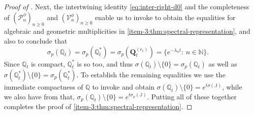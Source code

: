 \documentclass[10pt]{amsart}
\theoremstyle{plain}
\theoremstyle{definition}
\newcommand{\N}{\mathbb{N}}
\renewcommand{\P}{\mathcal{P}}
\newcommand{\V}{\mathcal{V}}
\newcommand{\J}{\mathds{Q}}
\newcommand{\calJ}{\mathds{J}}
\newcommand{\vat}{{\mathsf{r}_1}}
\newcommand{\Q}[1][\mo]{\mathbf{Q}^{({#1})}}
\let\mo\mu
\begin{document}
\begin{proof}[Proof of ]
Next, the intertwining identity \eqref{eq:inter-right-d0} and the completeness of $(\P_n^\phi)_{n \geq 0}$ and $(\V_n^\phi)_{n \geq 0}$ enable us to invoke \cite[Prop.\,11.4]{Patie-Savov-GeL} to obtain the equalities for algebraic and geometric multiplicities in \eqref{item-3:thm:spectral-representation}, and also to conclude that
\begin{equation*}
\sigma_p(\J_t) = \sigma_p(\J_t^*) = \sigma_p(\Q[\vat]_t) = \{e^{-\lambda_n t} : \ n \in \N\}.
\end{equation*}
Since $\J_t$ is compact, $\J_t^*$ is so too, and thus $\sigma(\J_t) \setminus \{0\} = \sigma_p(\J_t)$ as well as
$\sigma(\J_t^*) \setminus \{0\} = \sigma_p(\J_t^*)$. To establish the remaining equalities we use the immediate compactness of $\J$ to invoke \cite[Cor.\,3.12]{EngelNagel} and obtain $\sigma(\J_t) \setminus \{0\} = e^{t\sigma(\calJ)}$, while we also have from \cite[Th.\,3.7]{EngelNagel} that, $\sigma_p(\J_t) \setminus \{0\} = e^{t\sigma_p(\calJ)}$. Putting all of these together completes the proof of \eqref{item-3:thm:spectral-representation}.


\end{proof}
\end{document}
